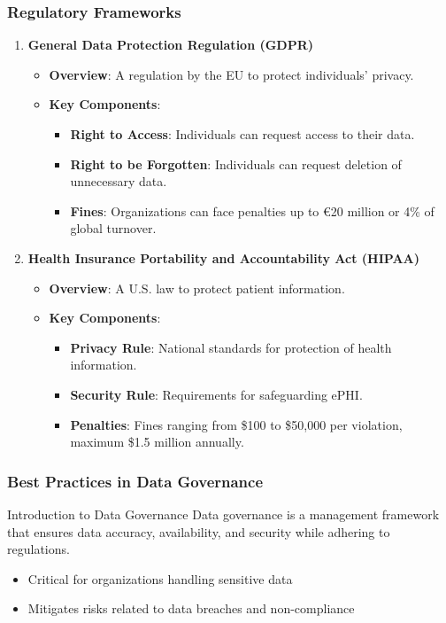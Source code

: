 \documentclass[aspectratio=169]{beamer}
\begin{document}
\begin{frame}[fragile]
    \frametitle{Regulatory Frameworks}
    \begin{enumerate}
        \item \textbf{General Data Protection Regulation (GDPR)}
            \begin{itemize}
                \item \textbf{Overview}: A regulation by the EU to protect individuals' privacy.
                \item \textbf{Key Components}:
                    \begin{itemize}
                        \item \textbf{Right to Access}: Individuals can request access to their data.
                        \item \textbf{Right to be Forgotten}: Individuals can request deletion of unnecessary data.
                        \item \textbf{Fines}: Organizations can face penalties up to €20 million or 4\% of global turnover.
                    \end{itemize}
            \end{itemize}

        \item \textbf{Health Insurance Portability and Accountability Act (HIPAA)}
            \begin{itemize}
                \item \textbf{Overview}: A U.S. law to protect patient information.
                \item \textbf{Key Components}:
                    \begin{itemize}
                        \item \textbf{Privacy Rule}: National standards for protection of health information.
                        \item \textbf{Security Rule}: Requirements for safeguarding ePHI.
                        \item \textbf{Penalties}: Fines ranging from \$100 to \$50,000 per violation, maximum \$1.5 million annually.
                    \end{itemize}
            \end{itemize}
    \end{enumerate}
\end{frame}

\begin{frame}[fragile]
    \frametitle{Best Practices in Data Governance}
    \begin{block}{Introduction to Data Governance}
        Data governance is a management framework that ensures data accuracy, availability, and security while adhering to regulations.
    \end{block}
    \begin{itemize}
        \item Critical for organizations handling sensitive data
        \item Mitigates risks related to data breaches and non-compliance
    \end{itemize}
\end{frame}
\end{document}
